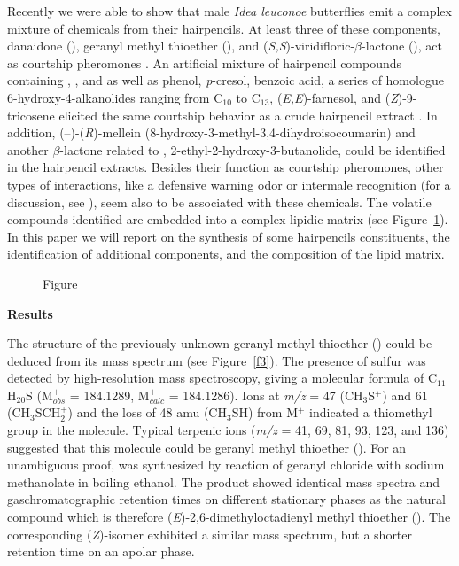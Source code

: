 \documentclass[11pt]{article}
\begin{document}
Recently we were able to show that  male \emph{Idea leuconoe} butterflies emit  a complex
mixture of chemicals from their hairpencils. At least three of these components,
danaidone (), geranyl methyl thioether (), and
(\emph{S,S})-viridifloric-$\beta$-lactone (), act as courtship  pheromones
\cite{c5}.  An artificial mixture of hairpencil compounds containing ,
, and  as well as phenol, \emph{p}-cresol, benzoic acid,  a series of
homologue 6-hydroxy-4-alkanolides ranging from C$_{10}$ to C$_{13}$,
(\emph{E,E})-farnesol,  and (\emph{Z})-9-tricosene elicited the same courtship behavior
as a crude hairpencil extract \cite{c5}. In addition, (--)-(\emph{R})-mellein
(8-hydroxy-3-methyl-3,4-dihydroisocoumarin) and another $\beta$-lactone related to
, 2-ethyl-2-hydroxy-3-butanolide, could be identified  in the hairpencil
extracts. Besides their function as courtship pheromones, other types of interactions,
like a defensive warning odor or intermale  recognition (for a discussion, see
\cite{c5}), seem also to be associated with these chemicals.  The volatile compounds
identified are embedded into a complex lipidic matrix (see Figure~\ref{f2}).
 In this paper we will report on the synthesis of some
hairpencils constituents, the identification of additional   components, and the
composition of the lipid matrix.

\begin{figure}[h!]
  \centering
  \caption{Figure}\label{f2}
\end{figure}

\begin{center}
\textbf{Results}
\end{center}
The structure of the previously unknown geranyl methyl thioether () could be
deduced from its mass spectrum (see Figure~\ref{f3}). The
presence of sulfur was detected by high-resolution mass spectroscopy, giving a molecular
formula of C$_{11}$H$_{20}$S
 (M$^{+}_{obs}$ = 184.1289, M$^{+}_{calc}$ = 184.1286).
Ions at \emph{m/z} = 47 (CH$_{3}$S$^{+}$) and 61 (CH$_{3}$SCH$_{2}^{+}$) and the loss of
48 amu (CH$_{3}$SH)  from  M$^{+}$ indicated a thiomethyl group in the molecule. Typical
terpenic ions (\emph{m/z} = 41, 69, 81, 93, 123, and 136) suggested that this molecule
could be geranyl methyl thioether ().  For an unambiguous proof,  was
synthesized by reaction of geranyl chloride with sodium methanolate in boiling ethanol.
The product showed identical mass spectra and gaschromatographic retention times on
different stationary phases as the natural compound which is therefore
(\emph{E})-2,6-dimethyloctadienyl methyl thioether (). The corresponding
(\emph{Z})-isomer exhibited a similar mass spectrum, but a shorter retention time on an
apolar phase.
\end{document}
